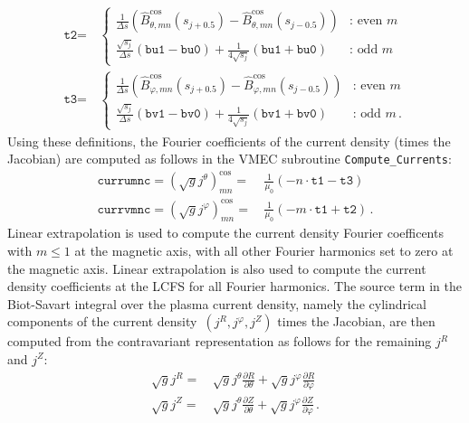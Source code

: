 \begin{align}
 \texttt{t2} =&\, \begin{cases}
                   \frac{   1      }{\Delta s} \left( \hat{B}_{\theta, mn}^\mathrm{cos}(s_{j+0.5}) - \hat{B}_{\theta, mn}^\mathrm{cos}(s_{j-0.5}) \right)     &:\, \textrm{even } m \\
                   \frac{\sqrt{s_j}}{\Delta s} \left( \texttt{bu1} - \texttt{bu0} \right) + \frac{1}{4 \sqrt{s_j}} \left( \texttt{bu1} + \texttt{bu0} \right) &:\, \textrm{odd  } m
                  \end{cases} \\
 \texttt{t3} =&\, \begin{cases}
                   \frac{   1      }{\Delta s} \left( \hat{B}_{\varphi, mn}^\mathrm{cos}(s_{j+0.5}) - \hat{B}_{\varphi, mn}^\mathrm{cos}(s_{j-0.5}) \right)       &:\, \textrm{even } m \\
                   \frac{\sqrt{s_j}}{\Delta s} \left( \texttt{bv1} - \texttt{bv0} \right) + \frac{1}{4 \sqrt{s_j}} \left( \texttt{bv1} + \texttt{bv0} \right) &:\, \textrm{odd  } m  \, .
                  \end{cases}
\end{align}
%
Using these definitions, the Fourier coefficients of the current density (times the Jacobian)
are computed as follows in the VMEC subroutine \texttt{Compute\_Currents}:
\begin{align}
 \texttt{currumnc} = (\sqrt{g} j^\theta)^{\textrm{cos}}_{mn}
   =&\, \frac{1}{\mu_0} \left( -n \cdot \texttt{t1} - \texttt{t3} \right) \\
 \texttt{currvmnc} = (\sqrt{g} j^\varphi )^{\textrm{cos}}_{mn}
   =&\, \frac{1}{\mu_0} \left( -m \cdot \texttt{t1} + \texttt{t2} \right) \, .
\end{align}
%
Linear extrapolation is used to compute the current density Fourier coefficents with $m \leq 1$ at the magnetic axis,
with all other Fourier harmonics set to zero at the magnetic axis.
%
Linear extrapolation is also used to compute the current density coefficients at the LCFS for all Fourier harmonics.
%
The source term in the Biot-Savart integral over the plasma current density,
namely the cylindrical components of the current density~$(j^{R}, j^{\varphi}, j^{Z})$ times the Jacobian,
are then computed from the contravariant representation as follows
for the remaining $j^R$ and $j^Z$:
\begin{align}
 \sqrt{g} j^{R}       =&\,   \sqrt{g} j^\theta \frac{\partial R}{\partial \theta} + \sqrt{g} j^\varphi \frac{\partial R}{\partial \varphi} \\
 \sqrt{g} j^{Z}       =&\,   \sqrt{g} j^\theta \frac{\partial Z}{\partial \theta} + \sqrt{g} j^\varphi \frac{\partial Z}{\partial \varphi} \, .
\end{align}

